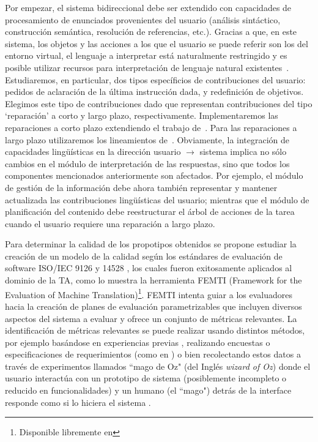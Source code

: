 Por empezar, el sistema bidireccional debe ser extendido con capacidades de procesamiento
de enunciados provenientes del usuario (an\'alisis sint\'actico, construcci\'on sem\'antica,
resoluci\'on de referencias, etc.).  Gracias a que, en este sistema,  los objetos y las acciones
a los que el usuario se puede referir son los del entorno virtual,
el lenguaje a interpretar est\'a naturalmente restringido y es posible 
utilizar recursos para interpretaci\'on de lenguaje natural
existentes~\citep{kow06}.  Estudiaremos, en particular, dos
tipos espec\'ificios de contribuciones del usuario: pedidos de aclaraci\'on
de la \'ultima instrucci\'on dada, y redefinici\'on de objetivos.  Elegimos
este tipo de contribuciones dado que representan contribuciones del tipo
`reparaci\'on' a corto y largo plazo, respectivamente. Implementaremos las
reparaciones a corto plazo extendiendo el trabajo de~\cite{purver06}.  Para
las reparaciones a largo plazo utilizaremos los lineamientos
de~\cite{blaylock05a,blaylock05b}.  Obviamente, la integraci\'on de capacidades
ling\"u\'isticas en la direcci\'on usuario $\to$ sistema implica no s\'olo
cambios en el m\'odulo de interpretaci\'on de las respuestas, sino que todos los componentes mencionados
anteriormente son afectados.  Por ejemplo, el m\'odulo de gesti\'on de la
informaci\'on debe ahora tambi\'en representar y mantener actualizada las
contribuciones ling\"u\'isticas del usuario; mientras que el m\'odulo de
planificaci\'on del contenido debe reestructurar el \'arbol de acciones
de la tarea cuando el usuario requiere una reparaci\'on a largo plazo.
\medskip

\noindent
Para determinar la calidad de los propotipos obtenidos se propone
estudiar la creaci\'on de un modelo de la calidad seg\'un los est\'andares de
evaluaci\'on de software ISO/IEC 9126 y 14528 \citep{ISO9126-1, ISO14598-1}, los
cuales fueron exitosamente aplicados al dominio de la TA, como lo muestra la
herramienta FEMTI (Framework for the Evaluation of Machine
Translation)\footnote{Disponible libremente en }. FEMTI
\citep{Est2005} intenta guiar a los evaluadores hacia la creaci\'on de planes de
evaluaci\'on parametrizables que incluyen diversos aspectos del sistema a evaluar
y ofrece un conjunto de m\'etricas relevantes. La identificaci\'on de m\'etricas
relevantes se puede realizar usando distintos m\'etodos, por
ejemplo bas\'andose en experiencias previas \citep{paradise06, Chu2000,
Litman2002}, realizando encuestas o especificaciones de requerimientos (como en
\citep{Lecoeuche98}) o bien recolectando estos datos a trav\'es de experimentos
llamados ``mago de Oz" (del Ingl\'es \emph{wizard of Oz}) donde el usuario
interact\'ua con un prototipo de sistema (posiblemente incompleto o reducido en
funcionalidades) y un humano (el ``mago") detr\'as de la interface
responde como si lo hiciera el sistema \citep{Dahlback93, Fabbrizio05}.

